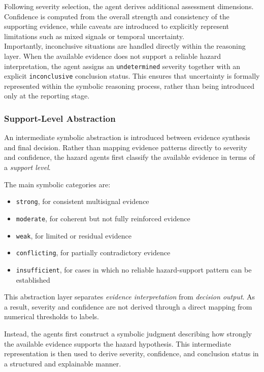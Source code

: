 \documentclass[12pt]{article}
\let\oldtexttt\texttt
\renewcommand{\texttt}[1]{{\fontsize{10.5}{12}\selectfont\oldtexttt{#1}}}
\begin{document}
Following severity selection, the agent derives additional assessment dimensions. Confidence is computed from the overall strength and consistency of the supporting evidence, while caveats are introduced to explicitly represent limitations such as mixed signals or temporal uncertainty.\\

Importantly, inconclusive situations are handled directly within the reasoning layer. When the available evidence does not support a reliable hazard interpretation, the agent assigns an \texttt{undetermined} severity together with an explicit \texttt{inconclusive} conclusion status. This ensures that uncertainty is formally represented within the symbolic reasoning process, rather than being introduced only at the reporting stage.

\subsubsection{Support-Level Abstraction}

An intermediate symbolic abstraction is introduced between evidence synthesis and final decision. Rather than mapping evidence patterns directly to severity and confidence, the hazard agents first classify the available evidence in terms of a \emph{support level}.

The main symbolic categories are:

\begin{itemize}
\item \texttt{strong}, for consistent multisignal evidence
\item \texttt{moderate}, for coherent but not fully reinforced evidence
\item \texttt{weak}, for limited or residual evidence
\item \texttt{conflicting}, for partially contradictory evidence
\item \texttt{insufficient}, for cases in which no reliable hazard-support pattern can be established
\end{itemize}

This abstraction layer separates \emph{evidence interpretation} from \emph{decision output}. As a result, severity and confidence are not derived through a direct mapping from numerical thresholds to labels.

Instead, the agents first construct a symbolic judgment describing how strongly the available evidence supports the hazard hypothesis. This intermediate representation is then used to derive severity, confidence, and conclusion status in a structured and explainable manner.
\end{document}
